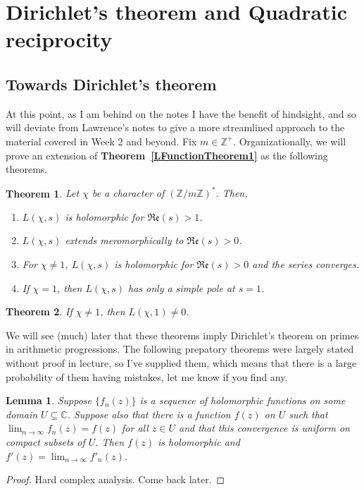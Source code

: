 \documentclass[12pt]{article}
\newcommand{\ints}{\mathbb{Z}}
\newcommand{\complex}{\mathbb{C}}
\newcommand{\intsmod}[1]{\ints / #1 \ints}
\newcommand{\tref}[1]{\textbf{Theorem~\ref{#1}}}
\newtheorem{thm}{Theorem}
\newtheorem{lemma}{Lemma}
\numberwithin{equation}{section}
\numberwithin{thm}{section}
\numberwithin{lemma}{section}
\numberwithin{cor}{section}
\begin{document}
\section{Dirichlet's theorem and Quadratic reciprocity}

\subsection{Towards Dirichlet's theorem}

At this point, as I am behind on the notes I have the benefit of hindsight, and so will deviate from Lawrence's notes to give a more streamlined approach to the material covered in Week 2 and beyond. Fix $m \in \ints^+$. Organizationally, we will prove an extension of \tref{LFunctionTheorem1} as the following theorems.

\begin{thm}\label{LFunctionSubTheorems1}
  Let $\chi$ be a character of $(\intsmod{m})^*$. Then, \begin{enumerate}
    \item $L(\chi, s)$ is holomorphic for $\mathfrak{Re}(s) > 1$.
    \item $L(\chi, s)$ extends meromorphically to $\mathfrak{Re}(s) > 0$.
    \item For $\chi \ne 1$, $L(\chi, s)$ is holomorphic for $\mathfrak{Re}(s) > 0$ and the series converges.
    \item If $\chi = 1$, then $L(\chi, s)$ has only a simple pole at $s=1$.
  \end{enumerate}
\end{thm}

\begin{thm}\label{LFunctionDoesntVanish}
  If $\chi \ne 1$, then $L(\chi, 1) \ne 0$.
\end{thm}

We will see (much) later that these theorems imply Dirichlet's theorem on primes in arithmetic progressions. The following prepatory theorems were largely stated without proof in lecture, so I've supplied them, which means that there is a large probability of them having mistakes, let me know if you find any.

\begin{lemma}\label{ConvergenceOnCompactImpliesConvergenceEverywhere}
  Suppose $\{f_n(z) \}$ is a sequence of holomorphic functions on some domain $U \subseteq \complex$. Suppose also that there is a function $f(z)$ on $U$ such that $\lim_{n \to \infty} f_n(z) = f(z)$ for all $z \in U$ and that this convergence is uniform on compact subsets of $U$. Then $f(z)$ is holomorphic and $f'(z) = \lim_{n \to \infty} f'_n(z)$. 
\end{lemma}
\begin{proof}
  Hard complex analysis. Come back later.
\end{proof}
\end{document}
